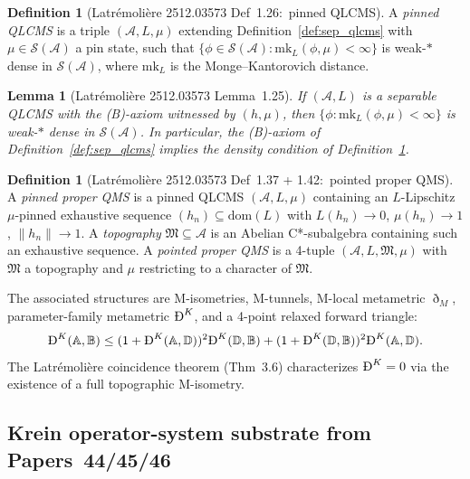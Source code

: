 \documentclass[11pt,a4paper]{article}
\theoremstyle{plain}
\newtheorem{lemma}[theorem]{Lemma}
\theoremstyle{definition}
\newtheorem{definition}[theorem]{Definition}
\newcommand{\Acal}{\mathcal{A}}
\newcommand{\Scal}{\mathcal{S}}
\newcommand{\norm}[1]{\lVert #1 \rVert}
\newcommand{\BigDeth}{\text{\DJ}^{K}}
\begin{document}
\begin{definition}[Latr\'emoli\`ere 2512.03573 Def~1.26:\ pinned
QLCMS]\label{def:pinned_qlcms}
A \emph{pinned QLCMS} is a triple $(\Acal, L, \mu)$ extending
Definition~\ref{def:sep_qlcms} with $\mu \in \Scal(\Acal)$ a pin
state, such that $\{\phi \in \Scal(\Acal) : \mathrm{mk}_{L}(\phi, \mu)
< \infty\}$ is weak-$*$ dense in $\Scal(\Acal)$, where $\mathrm{mk}_{L}$
is the Monge--Kantorovich distance.
\end{definition}

\begin{lemma}[Latr\'emoli\`ere 2512.03573 Lemma~1.25]\label{lem:tightness_corollary}
If $(\Acal, L)$ is a separable QLCMS with the (B)-axiom witnessed by
$(h, \mu)$, then $\{\phi : \mathrm{mk}_{L}(\phi, \mu) < \infty\}$ is
weak-$*$ dense in $\Scal(\Acal)$. In particular, the (B)-axiom of
Definition~\ref{def:sep_qlcms} implies the density condition of
Definition~\ref{def:pinned_qlcms}.
\end{lemma}

\begin{definition}[Latr\'emoli\`ere 2512.03573 Def~1.37 + 1.42:\
pointed proper QMS]\label{def:pointed_proper_qms}
A \emph{pinned proper QMS} is a pinned QLCMS
$(\Acal, L, \mu)$ containing an $L$-Lipschitz $\mu$-pinned
exhaustive sequence $(h_{n}) \subseteq \mathrm{dom}(L)$ with
$L(h_{n}) \to 0$, $\mu(h_{n}) \to 1$, $\norm{h_{n}} \to 1$. A
\emph{topography} $\mathfrak{M} \subseteq \Acal$ is an Abelian
C*-subalgebra containing such an exhaustive sequence. A
\emph{pointed proper QMS} is a 4-tuple $(\Acal, L, \mathfrak{M}, \mu)$
with $\mathfrak{M}$ a topography and $\mu$ restricting to a character
of $\mathfrak{M}$.
\end{definition}

The associated structures are M-isometries, M-tunnels, M-local
metametric $\eth_{M}$, parameter-family metametric $\BigDeth$, and a
4-point relaxed forward triangle:
\[
\BigDeth(\mathbb{A}, \mathbb{B})
\le (1 + \BigDeth(\mathbb{A}, \mathbb{D}))^{2}\BigDeth(\mathbb{D}, \mathbb{B})
+ (1 + \BigDeth(\mathbb{D}, \mathbb{B}))^{2}\BigDeth(\mathbb{A}, \mathbb{D}).
\]
The Latr\'emoli\`ere coincidence theorem (Thm~3.6) characterizes
$\BigDeth = 0$ via the existence of a full topographic M-isometry.

\subsection{Krein operator-system substrate from
Papers~44/45/46}\label{sec:krein_substrate_recap}
\end{document}
